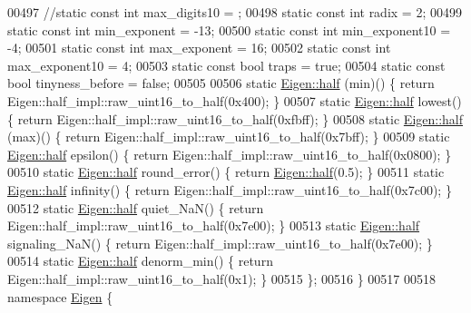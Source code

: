 \begin{DoxyCode}
00497   \textcolor{comment}{//static const int max\_digits10 = ;}
00498   \textcolor{keyword}{static} \textcolor{keyword}{const} \textcolor{keywordtype}{int} radix = 2;
00499   \textcolor{keyword}{static} \textcolor{keyword}{const} \textcolor{keywordtype}{int} min\_exponent = -13;
00500   \textcolor{keyword}{static} \textcolor{keyword}{const} \textcolor{keywordtype}{int} min\_exponent10 = -4;
00501   \textcolor{keyword}{static} \textcolor{keyword}{const} \textcolor{keywordtype}{int} max\_exponent = 16;
00502   \textcolor{keyword}{static} \textcolor{keyword}{const} \textcolor{keywordtype}{int} max\_exponent10 = 4;
00503   \textcolor{keyword}{static} \textcolor{keyword}{const} \textcolor{keywordtype}{bool} traps = \textcolor{keyword}{true};
00504   \textcolor{keyword}{static} \textcolor{keyword}{const} \textcolor{keywordtype}{bool} tinyness\_before = \textcolor{keyword}{false};
00505 
00506   \textcolor{keyword}{static} \hyperlink{struct_eigen_1_1half}{Eigen::half} (min)() \{ \textcolor{keywordflow}{return} Eigen::half\_impl::raw\_uint16\_to\_half(0x400); \}
00507   \textcolor{keyword}{static} \hyperlink{struct_eigen_1_1half}{Eigen::half} lowest() \{ \textcolor{keywordflow}{return} Eigen::half\_impl::raw\_uint16\_to\_half(0xfbff); \}
00508   \textcolor{keyword}{static} \hyperlink{struct_eigen_1_1half}{Eigen::half} (max)() \{ \textcolor{keywordflow}{return} Eigen::half\_impl::raw\_uint16\_to\_half(0x7bff); \}
00509   \textcolor{keyword}{static} \hyperlink{struct_eigen_1_1half}{Eigen::half} epsilon() \{ \textcolor{keywordflow}{return} Eigen::half\_impl::raw\_uint16\_to\_half(0x0800); \}
00510   \textcolor{keyword}{static} \hyperlink{struct_eigen_1_1half}{Eigen::half} round\_error() \{ \textcolor{keywordflow}{return} \hyperlink{struct_eigen_1_1half}{Eigen::half}(0.5); \}
00511   \textcolor{keyword}{static} \hyperlink{struct_eigen_1_1half}{Eigen::half} infinity() \{ \textcolor{keywordflow}{return} Eigen::half\_impl::raw\_uint16\_to\_half(0x7c00); \}
00512   \textcolor{keyword}{static} \hyperlink{struct_eigen_1_1half}{Eigen::half} quiet\_NaN() \{ \textcolor{keywordflow}{return} Eigen::half\_impl::raw\_uint16\_to\_half(0x7e00); \}
00513   \textcolor{keyword}{static} \hyperlink{struct_eigen_1_1half}{Eigen::half} signaling\_NaN() \{ \textcolor{keywordflow}{return} Eigen::half\_impl::raw\_uint16\_to\_half(0x7e00); \}
00514   \textcolor{keyword}{static} \hyperlink{struct_eigen_1_1half}{Eigen::half} denorm\_min() \{ \textcolor{keywordflow}{return} Eigen::half\_impl::raw\_uint16\_to\_half(0x1); \}
00515 \};
00516 \}
00517 
00518 \textcolor{keyword}{namespace }\hyperlink{namespace_eigen}{Eigen} \{

\end{DoxyCode}
